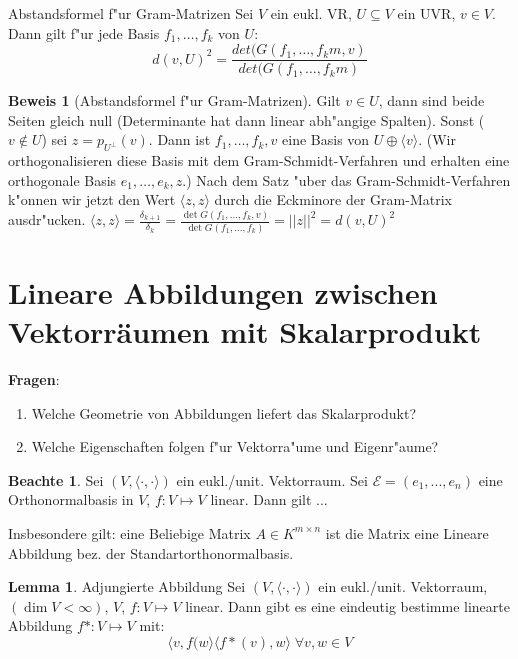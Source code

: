 \documentclass[oneside,fontsize=11pt,paper=a4,BCOR=0mm,DIV=12,automark,headsepline]{scrbook}
\theoremstyle{remark}
\theoremstyle{definition}
\newtheorem*{notte}{Beachte}
\newtheorem{lemma}{Lemma}[section]
\theoremstyle{definition}
\newtheorem*{prof}{Beweis}
\theoremstyle{remark}
\begin{document}
\begin{satz}{Abstandsformel f"ur Gram-Matrizen}
  Sei $V$ ein eukl. VR, $U\subseteq V$ ein UVR, $v\in V$. Dann gilt f"ur jede
  Basis $f_1, \ldots, f_k$ von $U$: \[d(v,U)^2 = \frac{det(G(f_1, \ldots, f_km, v)}{det(G(f_1, \ldots, f_km)}\]
\end{satz}

\begin{prof}[Abstandsformel f"ur Gram-Matrizen]
  Gilt \(v\in U\), dann sind beide Seiten gleich null (Determinante hat dann linear abh"angige Spalten). Sonst (\(v \not\in U\)) sei \(z = p_{U^\perp}(v)\). Dann ist \(f_1, \dots, f_k, v\) eine Basis von \(U\oplus \langle v\rangle\). (Wir orthogonalisieren diese Basis mit dem Gram-Schmidt-Verfahren und erhalten eine orthogonale Basis \(e_1, \dots, e_k, z\).) Nach dem Satz "uber das Gram-Schmidt-Verfahren k"onnen wir jetzt den Wert \(\langle z, z\rangle\) durch die Eckminore der Gram-Matrix ausdr"ucken. \(\langle z,z\rangle = \frac{\delta_{k+1}}{\delta_k} = \frac{\det G(f_1,\dots, f_k, v)}{\det G(f_1, \dots, f_k)} = ||z||^2 = d(v, U)^2\)
\end{prof}



\section{Lineare Abbildungen zwischen Vektorräumen mit Skalarprodukt }
\label{sec:vsk}
\textbf{Fragen}:
\begin{enumerate}
\item Welche Geometrie von Abbildungen liefert das Skalarprodukt?
\item Welche Eigenschaften folgen f"ur Vektorra"ume und Eigenr"aume?
\end{enumerate}

\begin{notte}
  Sei $(V, \langle {\cdot, \cdot} \rangle)$ ein eukl./unit. Vektorraum. Sei
  $\mathcal{E}=(e_1,...,e_n)$ eine Orthonormalbasis in $V$, $f: V\mapsto V $
  linear. Dann gilt ...

  Insbesondere gilt: eine Beliebige Matrix $A\in K^{m\times n}$ ist die Matrix
  eine Lineare Abbildung bez. der Standartorthonormalbasis.
\end{notte}

\begin{lemma}{Adjungierte Abbildung}
  Sei $(V, \langle {\cdot, \cdot} \rangle)$ ein eukl./unit. Vektorraum, $(\dim V
  < \infty)$, $V$, $f: V\mapsto V $ linear. Dann gibt es eine eindeutig bestimme
  linearte Abbildung $f*: V\mapsto V $ mit: \[
    \langle {v, f(w} \rangle \langle {f*(v), w} \rangle\; \forall v, w \in V
  \]
\end{lemma}
\end{document}
